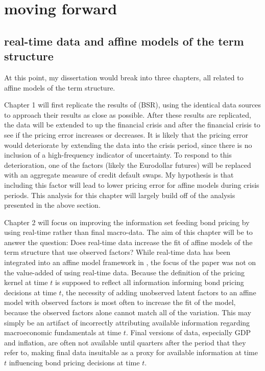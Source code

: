 \documentclass{article}
\numberwithin{equation}{section}
\begin{document}
\section{moving forward}

\subsection{real-time data and affine models of the term structure}

At this point, my dissertation would break into three chapters, all related to
affine models of the term structure.

Chapter 1 will first replicate the results of \citet{sack2005monetary} (BSR),
using the identical data sources to approach their results as close as
possible. After these results are replicated, the data will be extended to up
the financial crisis and after the financial crisis to see if the pricing error
increases or decreases. It is likely that the pricing error would deteriorate
by extending the data into the crisis period, since there is no inclusion of
a high-frequency indicator of uncertainty. To respond to this deterioration,
one of the factors (likely the Eurodollar futures) will be replaced with an
aggregate measure of credit default swaps. My hypothesis is that including this
factor will lead to lower pricing error for affine models during crisis
periods. This analysis for this chapter will largely build off of the analysis
presented in the above section.

Chapter 2 will focus on improving the information set feeding bond pricing by
using real-time rather than final macro-data. The aim of this chapter will be
to answer the question: Does real-time data increase the fit of affine models
of the term structure that use observed factors? While real-time data has been
integrated into an affine model framework in \citet{orphanideswei2010}, the
focus of the paper was not on the value-added of using real-time data. Because
the definition of the pricing kernel at time $t$ is supposed to reflect all
information informing bond pricing decisions at time $t$, the necessity of
adding unobserved latent factors to an affine model with observed factors is
most often to increase the fit of the model, because the observed factors alone
cannot match all of the variation. This may simply be an artifact of
incorrectly attributing available information regarding macroeconomic
fundamentals at time $t$. Final versions of data, especially GDP and inflation,
are often not available until quarters after the period that they refer to,
making final data insuitable as a proxy for available information at time $t$
influencing bond pricing decisions at time $t$. 
\end{document}
